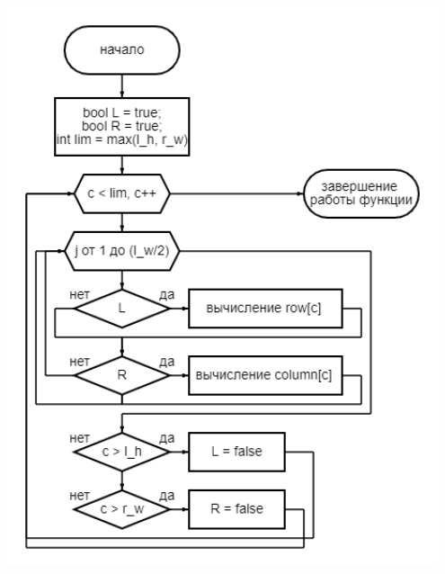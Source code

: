 \documentclass[14pt]{article}
\begin{document}
\begin{center}
		\includegraphics[width = 0.95\textwidth, height = 0.9\textheight]{diagram_4}
		\label{fig:label4}
		

\end{center}
\end{document}
